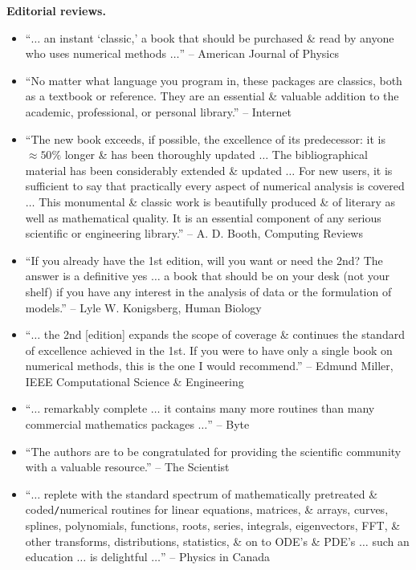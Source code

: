 \documentclass{article}
\begin{document}
\begin{enumerate}
	{\bf Editorial reviews.}
	\begin{itemize}
		\item ``$\ldots$ an instant `classic,' a book that should be purchased \& read by anyone who uses numerical methods $\ldots$'' -- American Journal of Physics
		\item ``No matter what language you program in, these packages are classics, both as a textbook or reference. They are an essential \& valuable addition to the academic, professional, or personal library.'' -- Internet
		\item ``The new book exceeds, if possible, the excellence of its predecessor: it is $\approx50\%$ longer \& has been thoroughly updated $\ldots$ The bibliographical material has been considerably extended \& updated $\ldots$ For new users, it is sufficient to say that practically every aspect of numerical analysis is covered $\ldots$ This monumental \& classic work is beautifully produced \& of literary as well as mathematical quality. It is an essential component of any serious scientific or engineering library.'' -- {\sc A. D. Booth}, Computing Reviews
		\item ``If you already have the 1st edition, will you want or need the 2nd? The answer is a definitive yes $\ldots$ a book that should be on your desk (not your shelf) if you have any interest in the analysis of data or the formulation of models.'' -- {\sc Lyle W. Konigsberg}, Human Biology
		\item ``$\ldots$ the 2nd [edition] expands the scope of coverage \& continues the standard of excellence achieved in the 1st. If you were to have only a single book on numerical methods, this is the one I would recommend.'' -- {\sc Edmund Miller}, IEEE Computational Science \& Engineering
		\item ``$\ldots$ remarkably complete $\ldots$ it contains many more routines than many commercial mathematics packages $\ldots$'' -- Byte
		\item ``The authors are to be congratulated for providing the scientific community with a valuable resource.'' -- The Scientist
		\item ``$\ldots$ replete with the standard spectrum of mathematically pretreated \& coded{\tt/}numerical routines for linear equations, matrices, \& arrays, curves, splines, polynomials, functions, roots, series, integrals, eigenvectors, FFT, \& other transforms, distributions, statistics, \& on to ODE's \& PDE's $\ldots$ such an education $\ldots$ is delightful $\ldots$'' -- Physics in Canada
	\end{itemize}


\end{enumerate}
\end{document}
